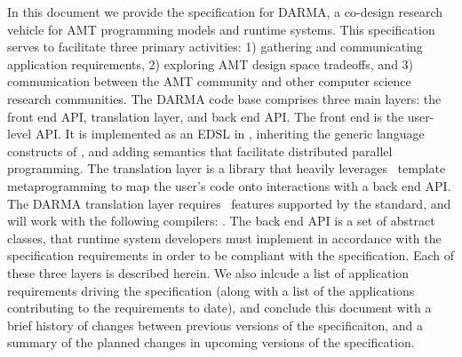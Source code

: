 In this document we provide the specification for DARMA,
a co-design research vehicle for \gls{AMT} programming models and runtime
systems.  This specification serves to facilitate three primary activities: 
1) gathering and communicating application requirements, 2) exploring AMT
design space tradeoffs, and 3) communication between the AMT community and
other computer science research communities.
The DARMA code base comprises three main layers: the \gls{front end} \gls{API},
\gls{translation layer}, and
\gls{back end} \gls{API}.  The \gls{front end} is the user-level \gls{API}.  It
is implemented as an \gls{EDSL} in \CC,  inheriting the generic language
constructs of \CC, and adding \gls{semantics} that facilitate distributed
parallel programming.
The \gls{translation layer} is a library that heavily leverages \CC\ \gls{template metaprogramming} 
to map the user's code onto interactions with a \gls{back end} \gls{API}.  
The DARMA \gls{translation layer} requires \CC\ features supported by the 
standard, and will work with the following compilers: .
The \gls{back end} \gls{API} is a set of abstract classes, that runtime system
developers must implement in accordance with the specification requirements in
order to be compliant with the specification.
Each of these three layers is described herein. We also inlcude a list of
application requirements driving the specification (along with a list of the
applications contributing to the requirements to date), and
conclude this document with
a brief history of changes between
previous versions of the specificaiton, and a summary of the planned changes 
in upcoming versions of the specification.

